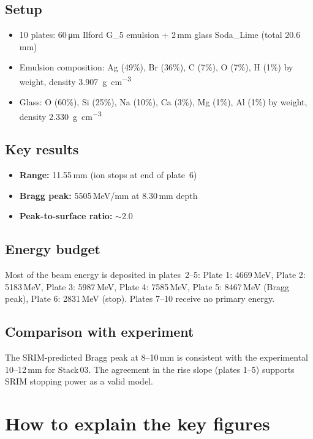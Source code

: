 \documentclass[12pt,a4paper]{article}
\begin{document}
\subsection{Setup}
\begin{itemize}
  \item 10 plates: 60\,\si{\micro\meter} Ilford G\_5 emulsion +
        2\,mm glass Soda\_Lime (total 20.6\,mm)
  \item Emulsion composition: Ag (49\%), Br (36\%), C (7\%), O (7\%),
        H (1\%) by weight, density \SI{3.907}{\g\per\cm\cubed}
  \item Glass: O (60\%), Si (25\%), Na (10\%), Ca (3\%), Mg (1\%),
        Al (1\%) by weight, density \SI{2.330}{\g\per\cm\cubed}
\end{itemize}

\subsection{Key results}
\begin{itemize}
  \item \textbf{Range:} 11.55\,mm (ion stops at end of plate~6)
  \item \textbf{Bragg peak:} 5505\,MeV/mm at 8.30\,mm depth
  \item \textbf{Peak-to-surface ratio:} $\sim$2.0
\end{itemize}

\subsection{Energy budget}
Most of the beam energy is deposited in plates~2--5:
Plate 1: 4669\,MeV, Plate 2: 5183\,MeV, Plate 3: 5987\,MeV,
Plate 4: 7585\,MeV, Plate 5: 8467\,MeV (Bragg peak), Plate 6: 2831\,MeV
(stop). Plates 7--10 receive no primary energy.

\subsection{Comparison with experiment}
The SRIM-predicted Bragg peak at 8--10\,mm is consistent with the
experimental 10--12\,mm for Stack\,03. The agreement in the rise slope
(plates 1--5) supports SRIM stopping power as a valid model.



\section{How to explain the key figures}
\end{document}
